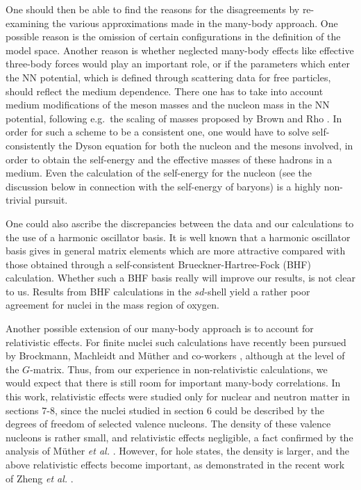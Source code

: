 \begin{itemize}
One should then be able to find the
reasons for the disagreements by re-examining the various
approximations made in the many-body approach. One possible
reason is the omission of certain configurations in the
definition of the model space. Another reason is whether neglected
many-body effects like effective three-body forces
would play an important role, or if the parameters which
enter the NN potential, which is defined through scattering
data for free particles, should reflect the medium dependence.
There one has to take into account medium modifications
of the
meson masses and the nucleon mass in the NN potential, following
e.g.\ the scaling of masses proposed by Brown and Rho \cite{br91}.
In order for such a scheme to be a consistent one, one would
have to solve self-consistently the Dyson equation for both
the nucleon and the mesons involved, in order to obtain
the self-energy and the effective masses of these hadrons in
a medium. Even the calculation of the self-energy for the nucleon (see the
discussion below in connection with the
self-energy of baryons) is a highly non-trivial pursuit.

One
could also ascribe the discrepancies between the data and our
calculations to the use
of a harmonic oscillator basis. It is well
known that a harmonic oscillator basis gives in general
matrix elements which are more attractive compared with those
obtained through a self-consistent Brueckner-Hartree-Fock (BHF)
calculation. Whether such a BHF basis really will improve
our results, is not clear to us. Results from BHF calculations
in the $sd$-shell \cite{homs90} yield a rather poor agreement for
nuclei in the mass region of oxygen.

Another possible extension of our many-body approach is to account
for relativistic effects. For finite nuclei such calculations
have recently been pursued by Brockmann, Machleidt and
M\"{u}ther and
co-workers \cite{mmb90,mbm88,bt93,fmm93,fm94}, although at the level
of the $G$-matrix. Thus, from our experience in non-relativistic
calculations, we would expect that
there is still room for important
many-body correlations.
In this work,
relativistic effects were studied only for nuclear and neutron matter
in sections 7-8,
since the nuclei studied in section 6 could be described by the
degrees of freedom of selected valence nucleons. The density of these
valence nucleons is rather small, and relativistic effects negligible,
a fact confirmed by the analysis of M\"{u}ther {\em et al.} \cite{mbm88}.
However, for hole states, the density is larger, and the above relativistic
effects become important, as demonstrated in
the recent work of Zheng {\em et al.} \cite{zzm92}.


\end{itemize}
